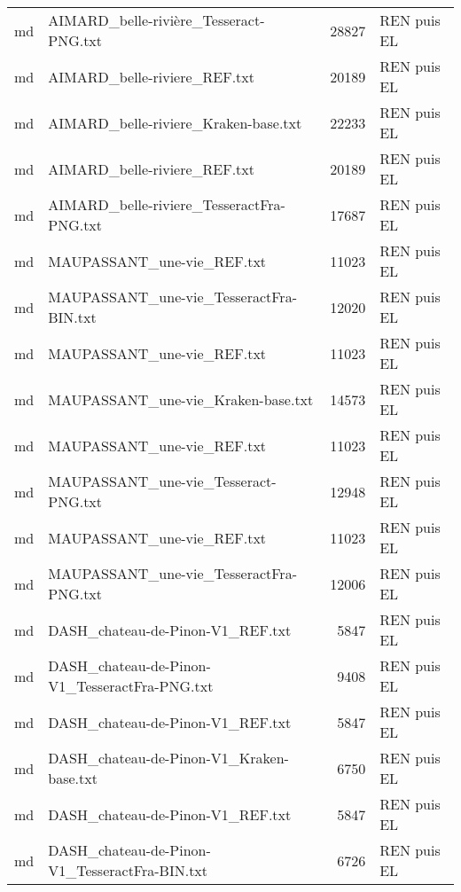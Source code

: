 \begin{tabular}{llrl}
    md &             AIMARD\_belle-rivière\_Tesseract-PNG.txt &                 28827 & REN puis EL \\
    md &                       AIMARD\_belle-riviere\_REF.txt &                 20189 & REN puis EL \\
    md &               AIMARD\_belle-riviere\_Kraken-base.txt &                 22233 & REN puis EL \\
    md &                       AIMARD\_belle-riviere\_REF.txt &                 20189 & REN puis EL \\
    md &          AIMARD\_belle-riviere\_TesseractFra-PNG.txt &                 17687 & REN puis EL \\
    md &                         MAUPASSANT\_une-vie\_REF.txt &                 11023 & REN puis EL \\
    md &            MAUPASSANT\_une-vie\_TesseractFra-BIN.txt &                 12020 & REN puis EL \\
    md &                         MAUPASSANT\_une-vie\_REF.txt &                 11023 & REN puis EL \\
    md &                 MAUPASSANT\_une-vie\_Kraken-base.txt &                 14573 & REN puis EL \\
    md &                         MAUPASSANT\_une-vie\_REF.txt &                 11023 & REN puis EL \\
    md &               MAUPASSANT\_une-vie\_Tesseract-PNG.txt &                 12948 & REN puis EL \\
    md &                         MAUPASSANT\_une-vie\_REF.txt &                 11023 & REN puis EL \\
    md &            MAUPASSANT\_une-vie\_TesseractFra-PNG.txt &                 12006 & REN puis EL \\
    md &                   DASH\_chateau-de-Pinon-V1\_REF.txt &                  5847 & REN puis EL \\
    md &      DASH\_chateau-de-Pinon-V1\_TesseractFra-PNG.txt &                  9408 & REN puis EL \\
    md &                   DASH\_chateau-de-Pinon-V1\_REF.txt &                  5847 & REN puis EL \\
    md &           DASH\_chateau-de-Pinon-V1\_Kraken-base.txt &                  6750 & REN puis EL \\
    md &                   DASH\_chateau-de-Pinon-V1\_REF.txt &                  5847 & REN puis EL \\
    md &      DASH\_chateau-de-Pinon-V1\_TesseractFra-BIN.txt &                  6726 & REN puis EL \\

\end{tabular}
